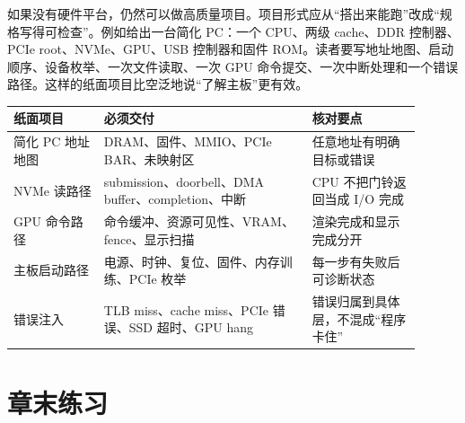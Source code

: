如果没有硬件平台，仍然可以做高质量项目。项目形式应从“搭出来能跑”改成“规格写得可检查”。例如给出一台简化 PC：一个 CPU、两级 cache、DDR 控制器、PCIe root、NVMe、GPU、USB 控制器和固件 ROM。读者要写地址地图、启动顺序、设备枚举、一次文件读取、一次 GPU 命令提交、一次中断处理和一个错误路径。这样的纸面项目比空泛地说“了解主板”更有效。

\begin{longtable}{L{0.2\linewidth}L{0.46\linewidth}L{0.24\linewidth}}
\toprule
纸面项目 & 必须交付 & 核对要点 \\
\midrule
简化 PC 地址地图 & DRAM、固件、MMIO、PCIe BAR、未映射区 & 任意地址有明确目标或错误 \\
NVMe 读路径 & submission、doorbell、DMA buffer、completion、中断 & CPU 不把门铃返回当成 I/O 完成 \\
GPU 命令路径 & 命令缓冲、资源可见性、VRAM、fence、显示扫描 & 渲染完成和显示完成分开 \\
主板启动路径 & 电源、时钟、复位、固件、内存训练、PCIe 枚举 & 每一步有失败后可诊断状态 \\
错误注入 & TLB miss、cache miss、PCIe 错误、SSD 超时、GPU hang & 错误归属到具体层，不混成“程序卡住” \\
\bottomrule
\end{longtable}



\section*{章末练习}

